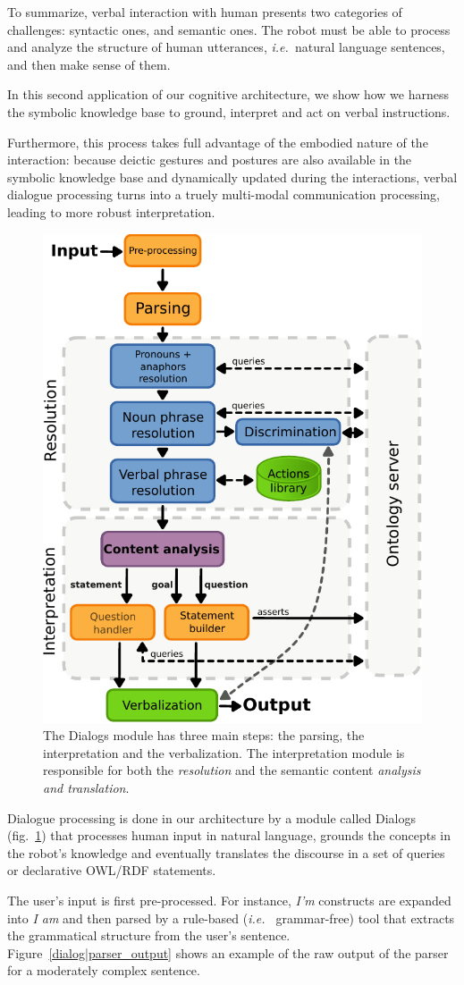 \documentclass{svmult}
\newcommand{\ie}{{\textit{i.e.~}}}
\begin{document}
To summarize, verbal interaction with human presents two categories of challenges: syntactic
ones, and semantic ones. The robot must be able to process and analyze the
structure of human utterances, \ie natural language sentences, and then make
sense of them. 

In this second application of our cognitive architecture, we show how we
harness the symbolic knowledge base to ground, interpret and act on verbal
instructions.

Furthermore, this process takes full advantage of the embodied nature of the
interaction: because deictic gestures and postures are also available in the
symbolic knowledge base and dynamically updated during the interactions, verbal
dialogue processing turns into a truely multi-modal communication processing,
leading to more robust interpretation.

\begin{figure}[!t]
\centering
  \includegraphics[width=0.5\linewidth]{figs/dialog_module_simple.pdf}
  \caption{The {\sc Dialogs} module has three main steps: the parsing,
  the interpretation and the verbalization. The interpretation module is
  responsible for both the \emph{resolution} and the semantic content
  \emph{analysis and translation}.} 
  \label{fig|dialog}
\end{figure}

Dialogue processing is done in our architecture by a module called {\sc
Dialogs}\cite{Lemaignan2011b} (fig.~\ref{fig|dialog}) that processes human input in natural
language, grounds the concepts in the robot's knowledge and eventually
translates the discourse in a set of queries or declarative OWL/RDF statements.  

The user's input is first pre-processed. For instance, \emph{I'm} constructs are expanded
into \emph{I am} and then parsed by a rule-based (\ie
grammar-free) tool that extracts the grammatical structure from the user's
sentence. Figure~\ref{dialog|parser_output} shows an example of the raw output of the parser for a moderately complex sentence.
\end{document}
